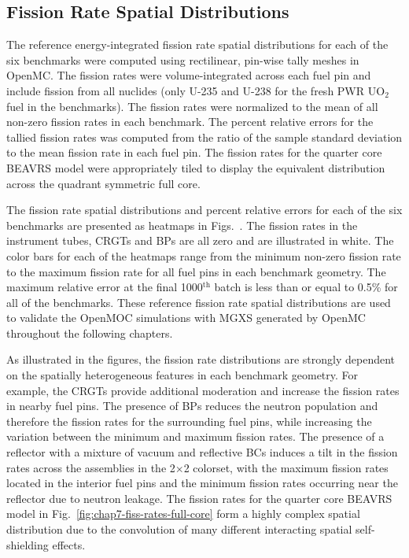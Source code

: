 \subsection{Fission Rate Spatial Distributions}
\label{subsec:chap7-pin-powers}

The reference energy-integrated fission rate spatial distributions for each of the six benchmarks were computed using rectilinear, pin-wise tally meshes in OpenMC. The fission rates were volume-integrated across each fuel pin and include fission from all nuclides (only U-235 and U-238 for the fresh \ac{PWR} UO$_2$ fuel in the benchmarks). The fission rates were normalized to the mean of all non-zero fission rates in each benchmark. The percent relative errors for the tallied fission rates was computed from the ratio of the sample standard deviation to the mean fission rate in each fuel pin. The fission rates for the quarter core \ac{BEAVRS} model were appropriately tiled to display the equivalent distribution across the quadrant symmetric full core.

The fission rate spatial distributions and percent relative errors for each of the six benchmarks are presented as heatmaps in Figs.~. The fission rates in the instrument tubes, \acp{CRGT} and \acp{BP} are all zero and are illustrated in white. The color bars for each of the heatmaps range from the minimum non-zero fission rate to the maximum fission rate for all fuel pins in each benchmark geometry. The maximum relative error at the final 1000$^{\text{th}}$ batch is less than or equal to 0.5\% for all of the benchmarks. These reference fission rate spatial distributions are used to validate the OpenMOC simulations with \ac{MGXS} generated by OpenMC throughout the following chapters.


As illustrated in the figures, the fission rate distributions are strongly dependent on the spatially heterogeneous features in each benchmark geometry. For example, the \acp{CRGT} provide additional moderation and increase the fission rates in nearby fuel pins. The presence of \acp{BP} reduces the neutron population and therefore the fission rates for the surrounding fuel pins, while increasing the variation between the minimum and maximum fission rates. The presence of a reflector with a mixture of vacuum and reflective \acp{BC} induces a tilt in the fission rates across the assemblies in the 2$\times$2 colorset, with the maximum fission rates located in the interior fuel pins and the minimum fission rates occurring near the reflector due to neutron leakage. The fission rates for the quarter core \ac{BEAVRS} model in Fig.~\ref{fig:chap7-fiss-rates-full-core} form a highly complex spatial distribution due to the convolution of many different interacting spatial self-shielding effects.

